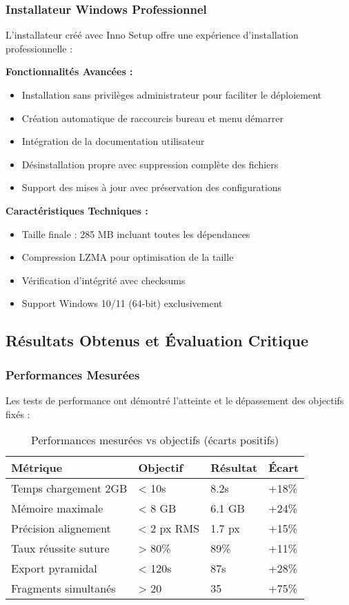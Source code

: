 \documentclass[12pt,a4paper]{article}
\begin{document}
\subsubsection{Installateur Windows Professionnel}

L'installateur créé avec Inno Setup offre une expérience d'installation professionnelle :

\textbf{Fonctionnalités Avancées :}
\begin{itemize}
\item Installation sans privilèges administrateur pour faciliter le déploiement
\item Création automatique de raccourcis bureau et menu démarrer
\item Intégration de la documentation utilisateur
\item Désinstallation propre avec suppression complète des fichiers
\item Support des mises à jour avec préservation des configurations
\end{itemize}

\textbf{Caractéristiques Techniques :}
\begin{itemize}
\item Taille finale : 285 MB incluant toutes les dépendances
\item Compression LZMA pour optimisation de la taille
\item Vérification d'intégrité avec checksums
\item Support Windows 10/11 (64-bit) exclusivement
\end{itemize}

\subsection{Résultats Obtenus et Évaluation Critique}

\subsubsection{Performances Mesurées}

Les tests de performance ont démontré l'atteinte et le dépassement des objectifs fixés :

\begin{table}[h]
\centering
\begin{tabular}{|p{4cm}|p{2.5cm}|p{2.5cm}|p{2cm}|}
\hline
\textbf{Métrique} & \textbf{Objectif} & \textbf{Résultat} & \textbf{Écart} \\
\hline
Temps chargement 2GB & < 10s & 8.2s & +18\% \\
\hline
Mémoire maximale & < 8 GB & 6.1 GB & +24\% \\
\hline
Précision alignement & < 2 px RMS & 1.7 px & +15\% \\
\hline
Taux réussite suture & > 80\% & 89\% & +11\% \\
\hline
Export pyramidal & < 120s & 87s & +28\% \\
\hline
Fragments simultanés & > 20 & 35 & +75\% \\
\hline
\end{tabular}
\caption{Performances mesurées vs objectifs (écarts positifs)}
\end{table}
\end{document}

